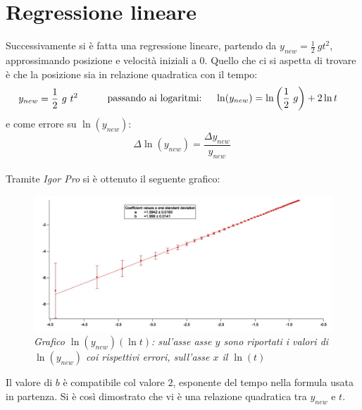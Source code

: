 \documentclass[12pt, a4paper]{article}
\begin{document}
\section{Regressione lineare}
Successivamente si è fatta una regressione lineare, partendo da $y_{new}= \frac{1}{2}\ g t^2$, approssimando posizione e velocità iniziali a $0$. Quello che ci si aspetta di trovare è che la posizione sia in relazione quadratica con il tempo:
\begin{equation*}
\begin{aligned}
  & y_{new}= \frac{1}{2}\ g\ t^2
  &\quad{} 
  \end{aligned}
  \begin{aligned}
  &&\text{passando ai logaritmi:\phantom{..}}& & \ln(y_{new})=\ln\left({\frac{1}{2}\ g}\right) +2\ln{t}
  &
  \end{aligned}
\end{equation*}
e come errore su $\ln({y_{new}})$: 
\begin{equation*}
    \Delta\ln{(y_{new})}=\frac{\Delta y_{new}}{y_{new}}\ 
\end{equation*}\\
 Tramite \textit{Igor Pro} si è ottenuto il seguente grafico:\\
   \begin{figure}[h!]
\centering
\includegraphics[width=170mm]{Immagini/GraphLn.jpg}
\caption{\textit{{\footnotesize{Grafico $\ln{(y_{new})}(\ln{t})$: sul'asse asse $y$ sono riportati i valori di $\ln{(y_{new})}$ coi rispettivi errori, sull'asse $x$ il $\ln{(t)}$}}}}
\label{Grafico logaritmico}
\end{figure}

Il valore di $b$ è compatibile col valore $2$, esponente del tempo nella formula usata in partenza.  Si è così dimostrato che vi è una relazione quadratica tra $y_{new}$ e $t$.
\end{document}
